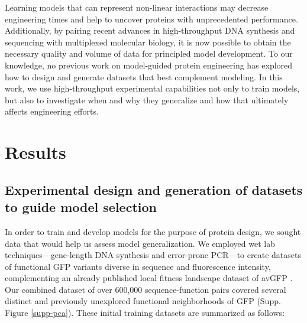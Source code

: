 Learning models that can represent non-linear interactions may decrease engineering times and help to uncover proteins with unprecedented performance. Additionally, by pairing recent advances in high-throughput DNA synthesis and sequencing with multiplexed molecular biology, it is now possible to obtain the necessary quality and volume of data for principled model development. To our knowledge, no previous work on model-guided protein engineering has explored how to design and generate datasets that best complement modeling. In this work, we use high-throughput experimental capabilities not only to train models, but also to investigate when and why they generalize and how that ultimately affects engineering efforts.

\section{Results}

\subsection{Experimental design and generation of datasets to guide model selection}

In order to train and develop models for the purpose of protein design, we sought data that would help us assess model generalization. We employed wet lab techniques---gene-length DNA synthesis and error-prone PCR---to create datasets of functional GFP variants diverse in sequence and fluorescence intensity, complementing an already published local fitness landscape dataset of avGFP \cite{Sarkisyan2016-cr}. Our combined dataset of over 600,000 sequence-function pairs covered several distinct and previously unexplored functional neighborhoods of GFP (Supp. Figure \ref{supp-pca}). These initial training datasets are summarized as follows:

